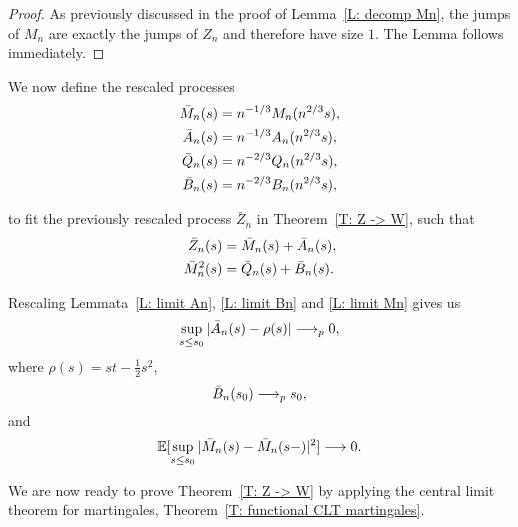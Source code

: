 \begin{proof} \label{P: limit Mn}
	As previously discussed in the proof of Lemma~\ref{L: decomp Mn}, 
	the jumps of $M_n$ are exactly the jumps of $Z_n$ and therefore have size $1$. 
	The Lemma follows immediately.
\end{proof}


We now define the rescaled processes 
\begin{equation}
\begin{aligned}
\bar{M}_n(s) &= n^{-1 / 3}M_n(n^{2 / 3}s), \\
\bar{A}_n(s) &= n^{-1 / 3}A_n(n^{2 / 3}s), \\
\bar{Q}_n(s) &= n^{-2 / 3}Q_n(n^{2 / 3}s), \\
\bar{B}_n(s) &= n^{-2 / 3}B_n(n^{2 / 3}s),
\end{aligned} 	
\end{equation}

to fit the previously rescaled process 
$\bar{Z}_n$ in Theorem~\ref{T: Z -> W}, such that
\begin{equation}
\begin{aligned}
\bar{Z}_n(s) &= \bar{M}_n(s) + \bar{A}_n(s), \\
\bar{M}_n^2(s) &= \bar{Q}_n(s) + \bar{B}_n(s).
\end{aligned}	
\end{equation}

Rescaling Lemmata~\ref{L: limit An}, \ref{L: limit Bn} and \ref{L: limit Mn} gives us
\begin{equation} \label{E: limit An rescaled}
\sup_{s \leq s_0} |\bar{A}_n(s) - \rho (s)| \longrightarrow_p 0,
\end{equation}
where $\rho (s) = st - \frac{1}{2}s^2$,
\begin{equation} \label{E: limit Bn rescaled}
\bar{B}_n(s_0) \longrightarrow_p s_0,
\end{equation}
and
\begin{equation} \label{E: limit Mn rescaled}
\mathbb{E}[\sup_{s \leq s_0} | \bar{M}_n(s) - \bar{M}_n(s-) |^2 ] \longrightarrow 0.
\end{equation}

We are now ready to prove Theorem~\ref{T: Z -> W} by applying the central limit theorem for martingales, Theorem~\ref{T: functional CLT martingales}.


